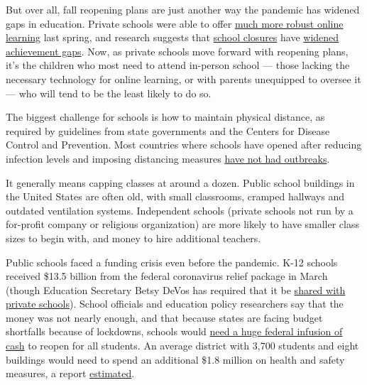 But over all, fall reopening plans are just another way the pandemic has
widened gaps in education. Private schools were able to offer
\href{https://www.nytimes3xbfgragh.onion/2020/05/09/us/coronavirus-public-private-school.html}{much
more robust online learning} last spring, and research suggests that
\href{https://www.nytimes3xbfgragh.onion/2020/07/29/health/covid-school-reopening.html}{school
closures} have
\href{https://www.nytimes3xbfgragh.onion/2020/06/05/us/coronavirus-education-lost-learning.html}{widened
achievement gaps}. Now, as private schools move forward with reopening
plans, it's the children who most need to attend in-person school ---
those lacking the necessary technology for online learning, or with
parents unequipped to oversee it --- who will tend to be the least
likely to do so.

The biggest challenge for schools is how to maintain physical distance,
as required by guidelines from state governments and the Centers for
Disease Control and Prevention. Most countries where schools have opened
after reducing infection levels and imposing distancing measures
\href{https://www.nytimes3xbfgragh.onion/2020/07/11/health/coronavirus-schools-reopen.html}{have
not had outbreaks}.

It generally means capping classes at around a dozen. Public school
buildings in the United States are often old, with small classrooms,
cramped hallways and outdated ventilation systems. Independent schools
(private schools not run by a for-profit company or religious
organization) are more likely to have smaller class sizes to begin with,
and money to hire additional teachers.

Public schools faced a funding crisis even before the pandemic. K-12
schools received \$13.5 billion from the federal coronavirus relief
package in March (though Education Secretary Betsy DeVos has required
that it be
\href{https://www.nytimes3xbfgragh.onion/2020/05/15/us/politics/betsy-devos-coronavirus-religious-schools.html}{shared
with private schools}). School officials and education policy
researchers say that the money was not nearly enough, and that because
states are facing budget shortfalls because of lockdowns, schools would
\href{https://www.nytimes3xbfgragh.onion/2020/07/09/us/schools-reopening-trump.html}{need
a huge federal infusion of cash} to reopen for all students. An average
district with 3,700 students and eight buildings would need to spend an
additional \$1.8 million on health and safety measures, a report
\href{https://www.asumag.com/covid-19/article/21133640/reopening-means-an-additional-18-million-in-costs-for-averagesized-school-district-administrators-estimate}{estimated}.

